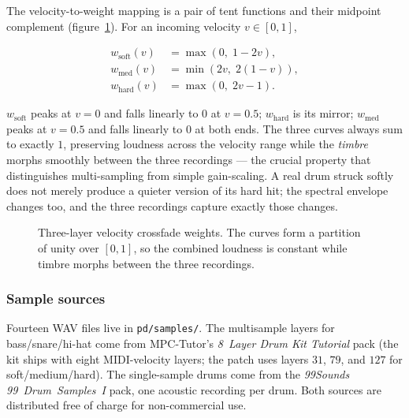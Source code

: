 \documentclass[11pt,a4paper]{article}
\begin{document}
The velocity-to-weight mapping is a pair of tent functions and their
midpoint complement (figure~\ref{fig:xfade}). For an incoming velocity
$v\in[0,1]$,

\begin{align*}
w_\text{soft}(v) &= \max(0,\; 1 - 2v), \\
w_\text{med} (v) &= \min(2v,\; 2(1-v)), \\
w_\text{hard}(v) &= \max(0,\; 2v - 1).
\end{align*}

$w_\text{soft}$ peaks at $v=0$ and falls linearly to $0$ at $v=0.5$;
$w_\text{hard}$ is its mirror; $w_\text{med}$ peaks at $v=0.5$ and
falls linearly to $0$ at both ends. The three curves always sum to
exactly $1$, preserving loudness across the velocity range while the
\emph{timbre} morphs smoothly between the three recordings --- the
crucial property that distinguishes multi-sampling from simple
gain-scaling. A real drum struck softly does not merely produce a
quieter version of its hard hit; the spectral envelope changes too,
and the three recordings capture exactly those changes.

\begin{figure}[h]
\centering
{}
\caption{Three-layer velocity crossfade weights. The curves form a
partition of unity over $[0,1]$, so the combined loudness is
constant while timbre morphs between the three recordings.}
\label{fig:xfade}
\end{figure}

\subsubsection*{Sample sources}

Fourteen WAV files live in \texttt{pd/samples/}. The multisample
layers for bass/snare/hi-hat come from MPC-Tutor's
\emph{8~Layer Drum Kit Tutorial} pack (the kit ships with eight
MIDI-velocity layers; the patch uses layers $31$, $79$, and $127$ for
soft/medium/hard). The single-sample drums come from the
\emph{99Sounds 99~Drum~Samples~I} pack, one acoustic recording per
drum. Both sources are distributed free of charge for non-commercial
use.
\end{document}

